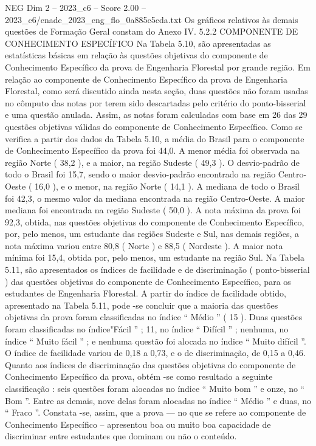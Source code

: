 \begin{textsample}{NEG Dim 2 – 2023\_c6 – Score 2.00 – 2023\_c6/enade\_2023\_eng\_flo\_0a885c5cda.txt}
Os gráficos relativos às demais questões de Formação Geral constam do Anexo IV. 5.2.2 COMPONENTE DE CONHECIMENTO ESPECÍFICO Na Tabela 5.10, são apresentadas as estatísticas básicas em relação às questões objetivas do componente de Conhecimento Específico da prova de Engenharia Florestal por grande região.
Em relação ao componente de Conhecimento Específico da prova de Engenharia Florestal, como será discutido ainda nesta seção, duas questões não foram usadas no cômputo das notas por terem sido descartadas pelo critério do ponto-bisserial e uma questão anulada.
Assim, as notas foram calculadas com base em 26 das 29 questões objetivas válidas do componente de Conhecimento Específico.
Como se verifica a partir dos dados da Tabela 5.10, a média do Brasil para o componente de Conhecimento Específico da prova foi 44,0.
A menor média foi observada na região Norte ( 38,2 ), e a maior, na região Sudeste ( 49,3 ).
O desvio-padrão de todo o Brasil foi 15,7, sendo o maior desvio-padrão encontrado na região Centro-Oeste ( 16,0 ), e o menor, na região Norte ( 14,1 ).
A mediana de todo o Brasil foi 42,3, o mesmo valor da mediana encontrada na região Centro-Oeste.
A maior mediana foi encontrada na região Sudeste ( 50,0 ).
A nota máxima da prova foi 92,3, obtida, nas questões objetivas do componente de Conhecimento Específico, por, pelo menos, um estudante das regiões Sudeste e Sul, nas demais regiões, a nota máxima variou entre 80,8 ( Norte ) e 88,5 ( Nordeste ).
A maior nota mínima foi 15,4, obtida por, pelo menos, um estudante na região Sul.
Na Tabela 5.11, são apresentados os índices de facilidade e de discriminação ( ponto-bisserial ) das questões objetivas do componente de Conhecimento Específico, para os estudantes de Engenharia Florestal.
A partir do índice de facilidade obtido, apresentado na Tabela 5.11, pode -se concluir que a maioria das questões objetivas da prova foram classificadas no índice “ Médio ” ( 15 ).
Duas questões foram classificadas no índice"Fácil ” ; 11, no índice “ Difícil ” ; nenhuma, no índice “ Muito fácil ” ; e nenhuma questão foi alocada no índice “ Muito difícil ”.
O índice de facilidade variou de 0,18 a 0,73, e o de discriminação, de 0,15 a 0,46.
Quanto aos índices de discriminação das questões objetivas do componente de Conhecimento Específico da prova, obtém -se como resultado a seguinte classificação : seis questões foram alocadas no índice “ Muito bom ” e onze, no “ Bom ”.
Entre as demais, nove delas foram alocadas no índice “ Médio ” e duas, no “ Fraco ”.
Constata -se, assim, que a prova — no que se refere ao componente de Conhecimento Específico – apresentou boa ou muito boa capacidade de discriminar entre estudantes que dominam ou não o conteúdo.

\end{textsample}
